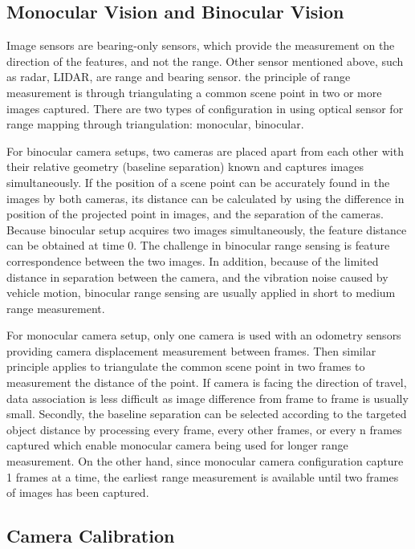 \subsection{Monocular Vision and Binocular Vision}
Image sensors are bearing-only sensors, which provide the measurement
on the direction of the features, and not the range. Other sensor
mentioned above, such as radar, LIDAR, are range and bearing sensor.
the principle of range measurement is through triangulating a common
scene point in two or more images captured. There are two types of
configuration in using optical sensor for range mapping through
triangulation: monocular, binocular. 

For binocular camera setups, two cameras are placed
apart from each other with their relative geometry (baseline
separation) known and captures images simultaneously. If the position
of a scene point can be accurately found in the images by both
cameras, its distance can be calculated by using the difference in
position of the projected point in images, and the separation of the
cameras. Because binocular setup acquires two images simultaneously,
the feature distance can be obtained at time 0. The challenge in
binocular range sensing is feature correspondence between the two
images. In addition, because of the limited distance in separation
between the camera, and the vibration noise caused by vehicle motion,
binocular range sensing are usually applied in short to medium range
measurement. 

For monocular camera setup, only one camera is used with an odometry
sensors providing camera displacement measurement between frames. Then
similar principle applies to triangulate the common scene point in two
frames to measurement the distance of the point. If camera is facing
the direction of travel, data association is less difficult as image
difference from frame to frame is usually small. Secondly, the
baseline separation can be selected according to the targeted object
distance by processing every frame, every other frames, or every n
frames captured which enable monocular camera being used for longer
range measurement. On the other hand, since monocular camera
configuration capture 1 frames at a time, the earliest range
measurement is available until two frames of images has been captured.

\subsection{Camera Calibration}


